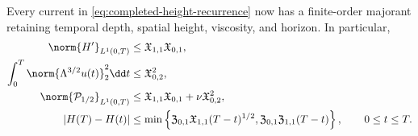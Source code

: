 {\begin{theorem}
Every current in \eqref{eq:completed-height-recurrence} now has a
finite-order majorant retaining temporal depth, spatial height, viscosity,
and horizon.
In particular,
\begin{align}
 \norm{H'}_{L^1(0,T)}
 &\le\mathfrak X_{1,1}\mathfrak X_{0,1},
 \label{eq:qc-sharp-height-variation}\\
 \int_0^T\norm{\Lambda^{3/2}u(t)}_2^2\dd t
 &\le\mathfrak X_{0,2}^2,
 \label{eq:qc-sharp-critical-dissipation}\\
 \norm{\mathcal P_{1/2}}_{L^1(0,T)}
 &\le\mathfrak X_{1,1}\mathfrak X_{0,1}
 +\nu\mathfrak X_{0,2}^2,
 \label{eq:qc-sharp-critical-current}\\
 |H(T)-H(t)|
 &\le\min\left\{
 \mathfrak Z_{0,1}\mathfrak X_{1,1}(T-t)^{1/2},
 \mathfrak Z_{0,1}\mathfrak Z_{1,1}(T-t)
 \right\},
 \qquad 0\le t\le T.
 \label{eq:qc-sharp-critical-modulus}
\end{align}


\end{theorem}}

